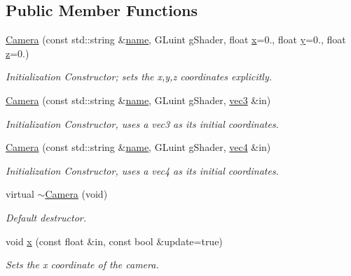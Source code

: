 \subsection*{Public Member Functions}
\begin{DoxyCompactItemize}
\item 
\hyperlink{class_camera_a16516fa8c830cecef5c8eb43eff12783}{Camera} (const std\-::string \&\hyperlink{class_object_a24457e0a387492c80594aec7681a2277}{name}, G\-Luint g\-Shader, float \hyperlink{class_camera_a14d59ca64bf258adacbed4e0e70ba701}{x}=0., float \hyperlink{class_camera_a5021b8379a853f306851837178856db0}{y}=0., float \hyperlink{class_camera_a4acfa20291c83f13c98781c0d53cdbd8}{z}=0.)
\begin{DoxyCompactList}\small\item\em Initialization Constructor; sets the x,y,z coordinates explicitly. \end{DoxyCompactList}\item 
\hyperlink{class_camera_a24329612384948d2b64f78094fe84e75}{Camera} (const std\-::string \&\hyperlink{class_object_a24457e0a387492c80594aec7681a2277}{name}, G\-Luint g\-Shader, \hyperlink{struct_angel_1_1vec3}{vec3} \&in)
\begin{DoxyCompactList}\small\item\em Initialization Constructor, uses a vec3 as its initial coordinates. \end{DoxyCompactList}\item 
\hyperlink{class_camera_aa131bc7f1bad2cc8baea463714c4485d}{Camera} (const std\-::string \&\hyperlink{class_object_a24457e0a387492c80594aec7681a2277}{name}, G\-Luint g\-Shader, \hyperlink{struct_angel_1_1vec4}{vec4} \&in)
\begin{DoxyCompactList}\small\item\em Initialization Constructor, uses a vec4 as its initial coordinates. \end{DoxyCompactList}\item 
virtual \hyperlink{class_camera_a06211f202c145b3ec8253f96e1e654a6}{$\sim$\-Camera} (void)
\begin{DoxyCompactList}\small\item\em Default destructor. \end{DoxyCompactList}\item 
void \hyperlink{class_camera_a14d59ca64bf258adacbed4e0e70ba701}{x} (const float \&in, const bool \&update=true)
\begin{DoxyCompactList}\small\item\em Sets the x coordinate of the camera. \end{DoxyCompactList}\item 

\end{DoxyCompactItemize}
